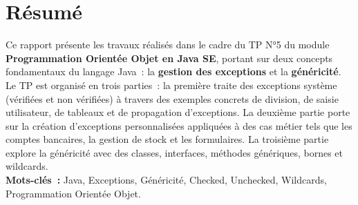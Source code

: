 
\chapter*{Résumé}

\begin{center}
{\large
Ce rapport présente les travaux réalisés dans le cadre du TP N°5 du module
\textbf{Programmation Orientée Objet en Java SE}, portant sur deux concepts
fondamentaux du langage Java~: la \textbf{gestion des exceptions} et la
\textbf{généricité}.\\[0.4cm]

Le TP est organisé en trois parties~: la première traite des exceptions
système (vérifiées et non vérifiées) à travers des exemples concrets de
division, de saisie utilisateur, de tableaux et de propagation d'exceptions.
La deuxième partie porte sur la création d'exceptions personnalisées
appliquées à des cas métier tels que les comptes bancaires, la gestion de
stock et les formulaires. La troisième partie explore la généricité avec
des classes, interfaces, méthodes génériques, bornes et wildcards.\\[0.4cm]

\textbf{Mots-clés~:} Java, Exceptions, Généricité, Checked, Unchecked,
Wildcards, Programmation Orientée Objet.
\vfill
}
\end{center}

%
%
%
